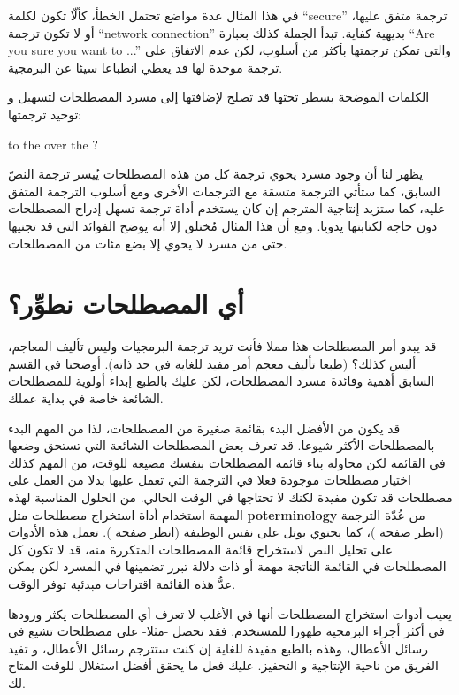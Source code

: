 في هذا المثال عدة مواضع تحتمل الخطأ، كألّا تكون لكلمة “secure” ترجمة
متفق عليها، أو لا تكون ترجمة “network connection” بديهية كفاية. تبدأ
الجملة كذلك بعبارة “Are you sure you want to ...” والتي تمكن ترجمتها
بأكثر من أسلوب، لكن عدم الاتفاق على ترجمة موحدة لها قد يعطي انطباعا
سيئا عن البرمجية.

الكلمات الموضحة بسطر تحتها قد تصلح لإضافتها إلى مسرد المصطلحات لتسهيل و
توحيد ترجمتها:

 to  the
 over the  ?

يظهر لنا أن وجود مسرد يحوي ترجمة كل من هذه المصطلحات يُيسر ترجمة النصّ
السابق، كما ستأتي الترجمة متسقة مع الترجمات الأخرى ومع أسلوب الترجمة
المتفق عليه، كما ستزيد إنتاجية المترجم إن كان يستخدم أداة ترجمة تسهل
إدراج المصطلحات دون حاجة لكتابتها يدويا. ومع أن هذا المثال مُختلق إلا
أنه يوضح الفوائد التي قد تجنيها حتى من مسرد لا يحوي إلا بضع مئات من
المصطلحات.

\section{أي المصطلحات نطوِّر؟}
قد يبدو أمر المصطلحات هذا مملا فأنت تريد ترجمة البرمجيات وليس تأليف
المعاجم، أليس كذلك؟ (طبعا تأليف معجم أمر مفيد للغاية في حد ذاته).
أوضحنا في القسم السابق أهمية وفائدة مسرد المصطلحات، لكن عليك بالطبع
إبداء أولوية للمصطلحات الشائعة خاصة في بداية عملك.

قد يكون من الأفضل البدء بقائمة صغيرة من المصطلحات، لذا من المهم البدء
بالمصطلحات الأكثر شيوعا. قد تعرف بعض المصطلحات الشائعة التي تستحق وضعها
في القائمة لكن محاولة بناء قائمة المصطلحات بنفسك مضيعة للوقت، من المهم
كذلك اختيار مصطلحات موجودة فعلا في الترجمة التي تعمل عليها بدلا من
العمل على مصطلحات قد تكون مفيدة لكنك لا تحتاجها في الوقت الحالي. من
الحلول المناسبة لهذه المهمة استخدام أداة استخراج مصطلحات مثل {\bf
poterminology} من عُدّة الترجمة (انظر صفحة
\at[ref:20165030])، كما يحتوي بوتل على نفس الوظيفة (انظر صفحة
\at[ref:20355427]). تعمل هذه الأدوات على تحليل النص لاستخراج
قائمة المصطلحات المتكررة منه، قد لا تكون كل المصطلحات في القائمة
الناتجة مهمة أو ذات دلالة تبرر تضمينها في المسرد لكن يمكن عدُّ هذه
القائمة اقتراحات مبدئية توفر الوقت.

يعيب أدوات استخراج المصطلحات أنها في الأغلب لا تعرف أي المصطلحات يكثر
ورودها في أكثر أجزاء البرمجية ظهورا للمستخدم. فقد تحصل -مثلا- على
مصطلحات تشيع في رسائل الأعطال، وهذه بالطبع مفيدة للغاية إن كنت ستترجم
رسائل الأعطال، و تفيد الفريق من ناحية الإنتاجية و التحفيز. عليك فعل ما
يحقق أفضل استغلال للوقت المتاح لك.

